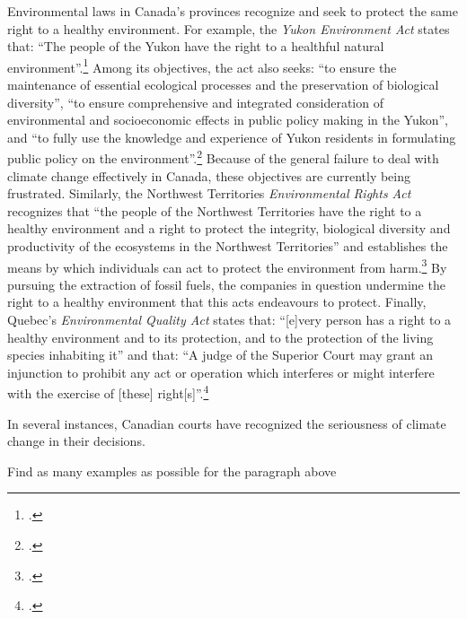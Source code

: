 Environmental laws in Canada's provinces recognize and seek to protect the same right to a healthy environment.  
For example, the \emph{Yukon Environment Act} states that: ``The people of the Yukon have the right to a healthful natural environment''.\footcite[][p. 14]{YukonEnvAct}
Among its objectives, the act also seeks: ``to ensure the maintenance of essential ecological processes and the preservation of biological diversity'', ``to ensure comprehensive and integrated consideration of environmental and socioeconomic effects in public policy making in the Yukon'', and ``to fully use the knowledge and experience of Yukon residents in formulating public policy on the environment''.\footcite[][p. 13]{YukonEnvAct}
Because of the general failure to deal with climate change effectively in Canada, these objectives are currently being frustrated.
Similarly, the Northwest Territories \emph{Environmental Rights Act} recognizes that ``the people of the Northwest Territories have the right to a healthy environment and a right to protect the integrity, biological diversity and productivity of the ecosystems in the Northwest Territories'' and establishes the means by which individuals can act to protect the environment from harm.\footcite[][]{NWTEnvRightsAct}
By pursuing the extraction of fossil fuels, the companies in question undermine the right to a healthy environment that this acts endeavours to protect. 
Finally, Quebec's \emph{Environmental Quality Act} states that: ``[e]very person has a right to a healthy environment and to its protection, and to the protection of the living species inhabiting it'' and that: ``A judge of the Superior Court may grant an injunction to prohibit any act or operation which interferes or might interfere with the exercise of [these] right[s]''.\footcite[][]{QuebecEQA}



In several instances, Canadian courts have recognized the seriousness of climate change in their decisions.

\begin{vcom}
Find as many examples as possible for the paragraph above
\end{vcom}


